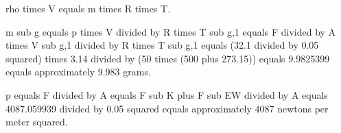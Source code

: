rho times V equals m times R times T.  

m sub g equals p times V divided by R times T sub g,1 equals F divided by A times V sub g,1 divided by R times T sub g,1 equals (32.1 divided by 0.05 squared) times 3.14 divided by (50 times (500 plus 273.15)) equals 9.9825399 equals approximately 9.983 grams.  

p equals F divided by A equals F sub K plus F sub EW divided by A equals 4087.059939 divided by 0.05 squared equals approximately 4087 newtons per meter squared.